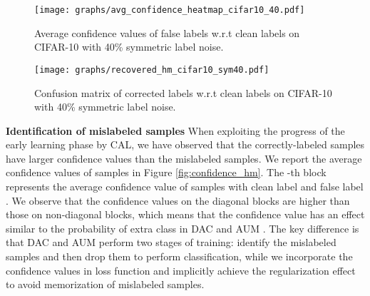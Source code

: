 \documentclass{article}
\begin{document}
\begin{figure}[t]
	\centering
	\begin{minipage}[t]{0.45\textwidth}
		\centering
		\texttt{[image: graphs/avg\_confidence\_heatmap\_cifar10\_40.pdf]}
		\caption{Average confidence values  of false labels w.r.t clean labels on CIFAR-10 with 40\% symmetric label noise.}
		\label{fig:confidence_hm}
	\end{minipage}
	\hspace{0.5cm}
	\begin{minipage}[t]{0.45\textwidth}	
		\centering
		\texttt{[image: graphs/recovered\_hm\_cifar10\_sym40.pdf]}
		\caption{Confusion matrix of corrected labels w.r.t clean labels on CIFAR-10 with 40\% symmetric label noise.}
		\label{fig:label_recover}
	\end{minipage}
\vspace{-0.9em}
\end{figure}





\textbf{Identification of mislabeled samples} When exploiting the progress of the early learning phase by CAL, we have observed that the correctly-labeled samples have larger confidence values than the mislabeled samples. We report the average confidence values of samples in Figure \ref{fig:confidence_hm}. The -th block represents the average confidence value of samples with clean label  and false label . We observe that the confidence values on the diagonal blocks are higher than those on non-diagonal blocks, which means that the confidence value has an effect similar to the probability of extra class in DAC \cite{thulasidasan2019combating} and AUM \cite{pleiss2020identifying}. The key difference is that DAC and AUM perform two stages of training: identify the mislabeled samples and then drop them to perform classification, while we incorporate the confidence values in loss function and implicitly achieve the regularization effect to avoid memorization of mislabeled samples. 












				
\end{document}
